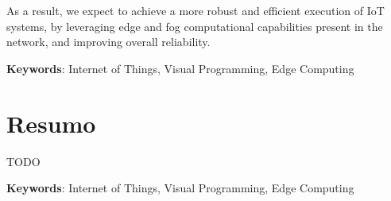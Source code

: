 As a result, we expect to achieve a more robust and efficient execution of IoT systems, by leveraging edge and fog computational capabilities present in the network, and improving overall reliability. 


\vspace*{10mm}\noindent
\textbf{Keywords}: Internet of Things, Visual Programming, Edge Computing

\chapter*{Resumo}

TODO

\vspace*{10mm}\noindent
\textbf{Keywords}: Internet of Things, Visual Programming, Edge Computing

